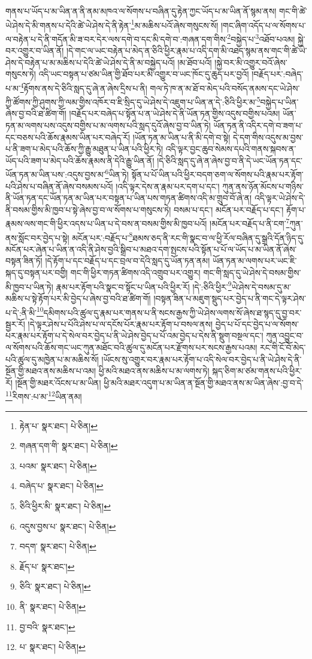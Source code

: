 གནས་པ་ཡོད་པ་མ་ཡིན་ན་ནི་ནམ་མཁའ་ལ་སོགས་པ་བཞིན་དུ་རྟེན་ཀྱང་ཡོད་པ་མ་ཡིན་ནོ་སྙམ་ནས། གང་གི་ཚེ་ཡེ་ཤེས་དེ་མི་གནས་པ་དེའི་ཚེ་ཡེ་ཤེས་དེ་ནི་རྟེན་\footnote{རྟེན་པ་  སྣར་ཐང་།  པེ་ཅིན། }མ་མཆིས་པའོ་ཞེས་གསུངས་སོ། །གང་ཞིག་འདོད་པ་ལ་སོགས་པ་ལ་བརྟེན་པ་དེ་ནི་གདོན་མི་ཟ་བར་དེར་ལས་དགེ་བ་དང་མི་དགེ་བ་:གཞན་དག་གིས་\footnote{གཞན་དག་གི་  སྣར་ཐང་།  པེ་ཅིན། }བསྐྱེད་པ་\footnote{པའམ་  སྣར་ཐང་།  པེ་ཅིན། }འཐོབ་པའམ། སྐྱེ་བར་འགྱུར་བ་ཡིན་ནོ། །དེ་གང་ལ་ཡང་བརྟེན་པ་མེད་ན་ཅིའི་ཕྱིར་རྣམ་པ་འདི་དག་མི་འཐད་སྙམ་ནས་གང་གི་ཚེ་ཡེ་ཤེས་དེ་བརྟེན་པ་མ་མཆིས་པ་དེའི་ཚེ་ཡེ་ཤེས་དེ་ནི་མ་བསྐྱེད་པའོ། །མ་ཐོབ་པའོ། །སྐྱེ་བར་མི་འགྱུར་བའོ་ཞེས་གསུངས་ཏེ། འདི་ཡང་བསྟན་པ་ཙམ་ཡིན་གྱི་ཐོབ་པར་མི་འགྱུར་བ་ཡང་ཁོང་དུ་ཆུད་པར་བྱའོ། །བརྗོད་པར་:བཞེད་པ་མ་\footnote{བཞེད་པ་  སྣར་ཐང་།  པེ་ཅིན། }རྟོགས་ནས་དེ་ཅིའི་སླད་དུ་ཞེ་ན་ཞེས་དྲིས་པ་ནི། གལ་ཏེ་ཁ་ན་མ་ཐོ་བ་མེད་པའི་བསོད་ནམས་དང་ཡེ་ཤེས་ཀྱི་ཚོགས་ཀྱི་ཤུགས་ཀྱི་ལམ་གྱིས་འཁོར་བ་ཇི་སྲིད་དུ་ཡེ་ཤེས་དེ་འཇུག་པ་ཡིན་ན་དེ་:ཅིའི་ཕྱིར་མ་\footnote{ཅིའི་ཕྱིར་མི་  སྣར་ཐང་།  པེ་ཅིན། }བསྐྱེད་པ་ཡིན་ཞེས་བྱ་བའི་ཐ་ཚིག་གོ། །བརྗོད་པར་བཞེད་པ་སྟོན་པ་ན་ཡེ་ཤེས་དེ་ནི་ཡོན་ཏན་གྱིས་འདུས་བགྱིས་པའམ། ཡོན་ཏན་མ་ལགས་པས་འདུས་བགྱིས་པ་མ་ལགས་པའི་སླད་དུའོ་ཞེས་བྱ་བ་ཡིན་ཏེ། ཡོན་ཏན་ནི་འདིར་དགེ་བ་ཟག་པ་དང་བཅས་པའི་ཆོས་རྣམས་ཡིན་པར་བཞེད་རོ། །ཡོན་ཏན་མ་ཡིན་པ་ནི་མི་དགེ་བ་སྟེ། དེ་དག་གིས་འདུས་མ་བྱས་པ་ནི་ཟག་པ་མེད་པའི་ཆོས་ཀྱི་རྒྱུ་མཐུན་པ་ཡིན་པའི་ཕྱིར་ཏེ། འདི་ལྟར་བྱང་ཆུབ་སེམས་དཔའི་གནས་སྐབས་ན་ཡོད་པའི་ཟག་པ་མེད་པའི་ཆོས་རྣམས་ནི་དེའི་རྒྱུ་ཡིན་ནོ། །དེ་ཅིའི་སླད་དུ་ཞེ་ན་ཞེས་བྱ་བ་ནི་དེ་ཡང་ཡོན་ཏན་དང་ཡོན་ཏན་མ་ཡིན་པས་:འདུས་བྱས་མ་\footnote{འདུས་བྱས་པ་  སྣར་ཐང་།  པེ་ཅིན། }ཡིན་ཏེ། སྟོན་པ་པོ་ཡིན་པའི་ཕྱིར་བདག་ཅག་ལ་སོགས་པའི་རྣམ་པར་རྟོག་པའི་ཤེས་པ་བཞིན་ནོ་ཞེས་བསམས་པའོ། །འདི་ལྟར་དེས་ན་རྣམ་པར་དག་པ་དང་། ཀུན་ནས་ཉོན་མོངས་པ་གཉིས་ནི་ཡོན་ཏན་དང་ཡོན་ཏན་མ་ཡིན་པར་བསྟན་པ་ཡིན་པས་གཏན་ཚིགས་འདི་མ་གྲུབ་བོ་ཞེ་ན། འདི་ལྟར་ཡེ་ཤེས་དེ་ནི་བསམ་གྱིས་མི་ཁྱབ་པ་སྟེ་ཞེས་བྱ་བ་ལ་སོགས་པ་གསུངས་ཏེ། བསམ་པ་དང་། མངོན་པར་བརྗོད་པ་དང་། རྟོག་པ་རྣམས་ལས་གང་གི་ཕྱིར་འདས་པ་ཡིན་པ་དེ་བས་ན་བསམ་གྱིས་མི་ཁྱབ་པའོ། །མངོན་པར་བརྗོད་པ་ནི་ངག་\footnote{བདག་  སྣར་ཐང་།  པེ་ཅིན། }ཀུན་ནས་སློང་བར་བྱེད་པ་སྟེ། མངོན་པར་:བརྗོད་པ་\footnote{རྗོད་པ་  སྣར་ཐང་། }ཐམས་ཅད་ནི་རང་གི་སྣང་བ་ལ་ཕྱི་རོལ་བཞིན་དུ་སྒྲའི་དོན་ཉིད་དུ་མངོན་པར་ཞེན་པ་ཡིན་ན་འདི་ནི་ཤེས་བྱའི་སྒྲིབ་པ་མཐའ་དག་སྤངས་པའི་སྟོན་པ་པོ་ལ་ཡོད་པ་མ་ཡིན་ནོ་ཞེས་བསྟན་ཟིན་ཏོ། །དེ་རྟོག་པ་དང་བརྗོད་པ་དང་བྲལ་བ་དེའི་སླད་དུ་ཡོན་ཏན་ནམ། ཡོན་ཏན་མ་ལགས་པར་ཡང་ཇི་སྐད་དུ་བསྟན་པར་བགྱི། གང་གི་ཕྱིར་གཏན་ཚིགས་འདི་འགྲུབ་པར་འགྱུར། གང་གི་སླད་དུ་ཡེ་ཤེས་དེ་བསམ་གྱིས་མི་ཁྱབ་པ་ཡིན་ཏེ། རྣམ་པར་རྟོག་པའི་སྣང་བ་སྟོང་པ་ཡིན་པའི་ཕྱིར་རོ། །དེ་:ཅིའི་ཕྱིར་\footnote{ཅིའི་  སྣར་ཐང་།  པེ་ཅིན། }ཡེ་ཤེས་དེ་བསམ་དུ་མ་མཆིས་པ་སྟེ་རྟོག་པར་མི་བྱེད་པ་ཞེས་བྱ་བའི་ཐ་ཚིག་གོ། །བསྟན་ཟིན་པ་མཇུག་སྡུད་པར་བྱེད་པ་ནི་གང་དེ་ལྟར་ཤེས་པ་དེ་:ནི་མི་\footnote{ནི་  སྣར་ཐང་།  པེ་ཅིན། }དམིགས་པའི་ཚུལ་དུ་རྣམ་པར་གནས་པ་ནི་སངས་རྒྱས་ཀྱི་ཡེ་ཤེས་ལགས་སོ་ཞེས་ཐ་སྙད་དུ་བྱ་བར་སྦྱར་རོ། །དེ་ལྟར་ཤེས་པ་པོའི་ཤེས་པ་ལ་དངོས་པོར་རྣམ་པར་རྟོག་པ་བསལ་ནས། བྱེད་པ་པོ་དང་བྱེད་པ་ལ་སོགས་པར་རྣམ་པར་རྟོག་པ་དེ་སེལ་བར་བྱེད་པ་ནི་ཡེ་ཤེས་བྱེད་པ་པོ་འམ་བྱེད་པ་དེས་ནི་སྡུག་བསྔལ་དང་། ཀུན་འབྱུང་བ་ལ་སོགས་པའི་ཆོས་གང་ཡང་ཀུན་མཐོང་བའི་ཚུལ་དུ་མངོན་པར་རྫོགས་པར་སངས་རྒྱས་པའམ། རང་གི་ངོ་བོ་མེད་པའི་ཚུལ་དུ་མཁྱེན་པ་མ་མཆིས་སོ། །ཡོངས་སུ་འགྱུར་བར་རྣམ་པར་རྟོག་པ་འདི་སེལ་བར་བྱེད་པ་ནི་ཡེ་ཤེས་དེ་ནི་སྔོན་གྱི་མཐའ་ནས་མཆིས་པ་འམ། ཕྱི་མའི་མཐའ་ནས་མཆིས་པ་མ་ལགས་ཏེ། སྐད་ཅིག་མ་ཙམ་གནས་པའི་ཕྱིར་རོ། །སྔོན་གྱི་མཐར་འོངས་པ་མ་ཡིན། ཕྱི་མའི་མཐར་འདུག་པ་མ་ཡིན་ན་སྔོན་གྱི་མཐའ་ནས་མ་ཡིན་ཞེས་:བྱ་བ་དེ་\footnote{བྱ་བའི་  སྣར་ཐང་། }རིགས་:པ་མ་\footnote{པ་  སྣར་ཐང་།  པེ་ཅིན། }ཡིན་ནམ། 